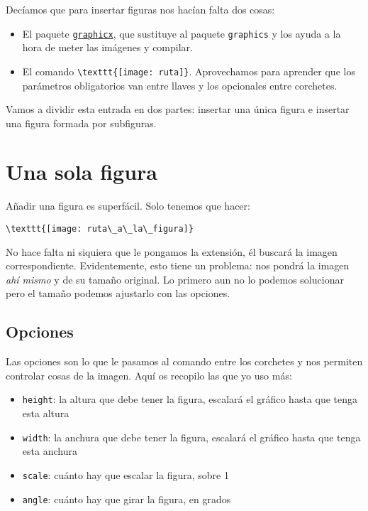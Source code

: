 Decíamos que para insertar figuras nos hacían falta dos cosas:

\begin{itemize}
\item
  El paquete
  \href{https://ctan.org/pkg/graphicx}{\lstinline!graphicx!}, que sustituye al paquete
  \lstinline!graphics! y los ayuda a la hora de meter las imágenes y compilar.
\item
  El comando \lstinline!\texttt{[image: ruta]}!. Aprovechamos
  para aprender que los parámetros obligatorios van entre llaves y los
  opcionales entre corchetes.
\end{itemize}

Vamos a dividir esta entrada en dos partes: insertar una única figura e
insertar una figura formada por subfiguras.

\section{Una sola figura}\label{sec:unaFigura}

Añadir una figura es superfácil. Solo tenemos que hacer:

\begin{lstlisting}[language={[latex]tex}]
\texttt{[image: ruta\_a\_la\_figura]}
\end{lstlisting}

No hace falta ni siquiera que le pongamos la extensión, él buscará la
imagen correspondiente. Evidentemente, esto tiene un problema: nos
pondrá la imagen \emph{ahí mismo} y de su tamaño original. Lo primero
aun no lo podemos solucionar pero el tamaño podemos ajustarlo con las
opciones.

\subsection{Opciones}\label{opciones}

Las opciones son lo que le pasamos al comando entre los corchetes y nos
permiten controlar cosas de la imagen. Aquí os recopilo las que yo uso
más:

\begin{itemize}
\item
  \lstinline!height!: la altura que debe tener la figura, escalará el
  gráfico hasta que tenga esta altura
\item
  \lstinline!width!: la anchura que debe tener la figura, escalará el
  gráfico hasta que tenga esta anchura
\item
  \lstinline!scale!: cuánto hay que escalar la figura, sobre 1
\item
  \lstinline!angle!: cuánto hay que girar la figura, en grados
\end{itemize}

